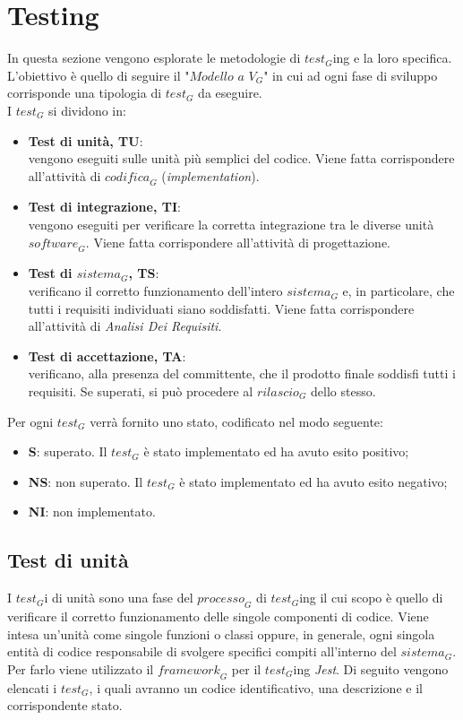 

\section{Testing}
In questa sezione vengono esplorate le metodologie di $\textit{test}_G$ing e la loro specifica. L'obiettivo è quello di seguire il "$\textit{Modello a V}_G$" in cui ad ogni fase di sviluppo corrisponde una tipologia di $\textit{test}_G$ da eseguire.\\
I $\textit{test}_G$ si dividono in:
\begin{itemize}
    \item \textbf{Test di unità, TU}:\\
    vengono eseguiti sulle unità più semplici del codice. Viene fatta corrispondere all'attività di $\textit{codifica}_G$ (\textit{implementation}).
    \item \textbf{Test di integrazione, TI}:\\
    vengono eseguiti per verificare la corretta integrazione tra le diverse unità $\textit{software}_G$. Viene fatta corrispondere all'attività di progettazione.
    \item \textbf{Test di $\textit{sistema}_G$, TS}:\\
    verificano il corretto funzionamento dell'intero $\textit{sistema}_G$ e, in particolare, che tutti i requisiti individuati siano soddisfatti. Viene fatta corrispondere all'attività di \textit{Analisi Dei Requisiti}. 
    \item \textbf{Test di accettazione, TA}:\\
    verificano, alla presenza del committente, che il prodotto finale soddisfi tutti i requisiti. Se superati, si può procedere al $\textit{rilascio}_G$ dello stesso.
\end{itemize}
Per ogni $\textit{test}_G$ verrà fornito uno stato, codificato nel modo seguente:
\begin{itemize}
    \item \textbf{S}: superato. Il $\textit{test}_G$ è stato implementato ed ha avuto esito positivo;
    \item \textbf{NS}: non superato. Il $\textit{test}_G$ è stato implementato ed ha avuto esito negativo;
    \item \textbf{NI}: non implementato.
\end{itemize}

\newpage
\subsection{Test di unità}
I $\textit{test}_G$i di unità sono una fase del $\textit{processo}_G$ di $\textit{test}_G$ing il cui scopo è quello di verificare il corretto funzionamento delle singole componenti di codice. Viene intesa un'unità come singole funzioni o classi oppure, in generale, ogni singola entità di codice responsabile di svolgere specifici compiti all'interno del $\textit{sistema}_G$. Per farlo viene utilizzato il $\textit{framework}_G$ per il $\textit{test}_G$ing \textit{Jest}. Di seguito vengono elencati i $\textit{test}_G$, i quali avranno un codice identificativo, una descrizione e il corrispondente stato.

